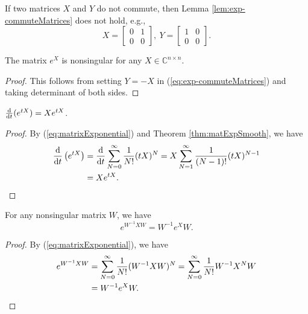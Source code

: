 \begin{exm}
  If two matrices $X$ and $Y$ do not commute,
  then Lemma \ref{lem:exp-commuteMatrices} does not hold,
  e.g., 
  \begin{displaymath}
    X=
    \begin{bmatrix}
      0 & 1 \\ 0 & 0
    \end{bmatrix}, \ 
    Y=
    \begin{bmatrix}
      1 & 0 \\ 0 & 0
    \end{bmatrix}.
  \end{displaymath}
\end{exm}

\begin{coro}
  The matrix $e^X$ is nonsingular
  for any $X\in \mathbb{C}^{n\times n}$.
\end{coro}
\begin{proof}
  This follows from 
  setting $Y=-X$ in (\ref{eq:exp-commuteMatrices})
  and taking determinant of both sides.
\end{proof}

\begin{lem}
  \label{lem:derivativeOfMatrixExponential}
  $\frac{\mathrm{d}}{\mathrm{d} t}(e^{tX}) = X e^{tX}$.
\end{lem}
\begin{proof}
  By (\ref{eq:matrixExponential}) and Theorem \ref{thm:matExpSmooth}, we have
  \begin{align*}
    \frac{\mathrm{d}}{\mathrm{d} t}\left(e^{tX}\right)
    &= \frac{\mathrm{d}}{\mathrm{d} t}\sum_{N=0}^{\infty} \frac{1}{N!}(tX)^N
    = X\sum_{N=1}^{\infty} \frac{1}{(N-1)!}(tX)^{N-1}
    \\
    &= X e^{tX}. \qedhere
  \end{align*}
\end{proof}

\begin{lem}
  \label{lem:expSimilarityTrans}
  For any nonsingular matrix $W$, we have 
  \begin{equation}
    \label{eq:expSimilarityTrans}
    e^{W^{-1}X W} = W^{-1} e^X W.
  \end{equation}
\end{lem}
\begin{proof}
  By (\ref{eq:matrixExponential}), we have
  \begin{align*}
    e^{W^{-1}X W} &= \sum_{N=0}^{\infty} \frac{1}{N!}(W^{-1}X W)^N
    = \sum_{N=0}^{\infty} \frac{1}{N!}W^{-1}X^N W
    \\
    &= W^{-1} e^X  W. \qedhere
  \end{align*}  
\end{proof}

